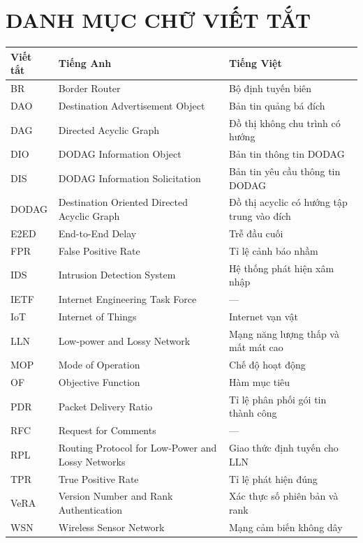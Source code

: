 \section*{DANH MỤC CHỮ VIẾT TẮT}
{}
\thispagestyle{empty}

\begin{table}[H]
\centering
\begin{tabularx}{\textwidth}{l L{1} l}
  \toprule
  \textbf{Viết tắt} & \textbf{Tiếng Anh} & \textbf{Tiếng Việt} \\
  \midrule
  BR      & Border Router
          & Bộ định tuyến biên \\
  DAO     & Destination Advertisement Object
          & Bản tin quảng bá đích \\
  DAG     & Directed Acyclic Graph
          & Đồ thị không chu trình có hướng \\
  DIO     & DODAG Information Object
          & Bản tin thông tin DODAG \\
  DIS     & DODAG Information Solicitation
          & Bản tin yêu cầu thông tin DODAG \\
  DODAG   & Destination Oriented Directed Acyclic Graph
          & Đồ thị acyclic có hướng tập trung vào đích \\
  E2ED    & End-to-End Delay
          & Trễ đầu cuối \\
  FPR     & False Positive Rate
          & Tỉ lệ cảnh báo nhầm \\
  IDS     & Intrusion Detection System
          & Hệ thống phát hiện xâm nhập \\
  IETF    & Internet Engineering Task Force
          & --- \\
  IoT     & Internet of Things
          & Internet vạn vật \\
  LLN     & Low-power and Lossy Network
          & Mạng năng lượng thấp và mất mát cao \\
  MOP     & Mode of Operation
          & Chế độ hoạt động \\
  OF      & Objective Function
          & Hàm mục tiêu \\
  PDR     & Packet Delivery Ratio
          & Tỉ lệ phân phối gói tin thành công \\
  RFC     & Request for Comments
          & --- \\
  RPL     & Routing Protocol for Low-Power and Lossy Networks
          & Giao thức định tuyến cho LLN \\
  TPR     & True Positive Rate
          & Tỉ lệ phát hiện đúng \\
  VeRA    & Version Number and Rank Authentication
          & Xác thực số phiên bản và rank \\
  WSN     & Wireless Sensor Network
          & Mạng cảm biến không dây \\
  \bottomrule
\end{tabularx}
\end{table}

\cleardoublepage
